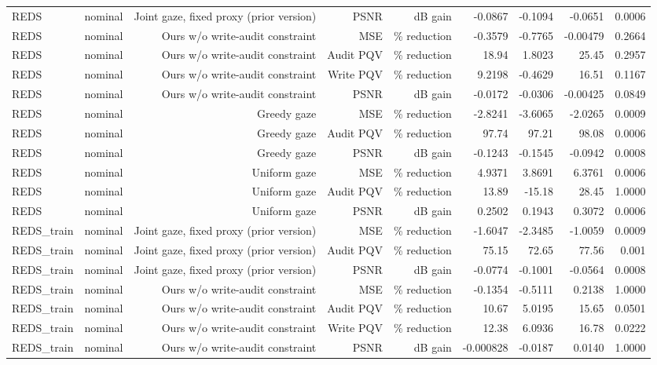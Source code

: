 \begin{table}[t]
\begin{tabular}{llrrrrrrr}
REDS & nominal & Joint gaze, fixed proxy (prior version) & PSNR & dB gain & -0.0867 & -0.1094 & -0.0651 & 0.0006 \\
REDS & nominal & Ours w/o write-audit constraint & MSE & \% reduction & -0.3579 & -0.7765 & -0.00479 & 0.2664 \\
REDS & nominal & Ours w/o write-audit constraint & Audit PQV & \% reduction & 18.94 & 1.8023 & 25.45 & 0.2957 \\
REDS & nominal & Ours w/o write-audit constraint & Write PQV & \% reduction & 9.2198 & -0.4629 & 16.51 & 0.1167 \\
REDS & nominal & Ours w/o write-audit constraint & PSNR & dB gain & -0.0172 & -0.0306 & -0.00425 & 0.0849 \\
REDS & nominal & Greedy gaze & MSE & \% reduction & -2.8241 & -3.6065 & -2.0265 & 0.0009 \\
REDS & nominal & Greedy gaze & Audit PQV & \% reduction & 97.74 & 97.21 & 98.08 & 0.0006 \\
REDS & nominal & Greedy gaze & PSNR & dB gain & -0.1243 & -0.1545 & -0.0942 & 0.0008 \\
REDS & nominal & Uniform gaze & MSE & \% reduction & 4.9371 & 3.8691 & 6.3761 & 0.0006 \\
REDS & nominal & Uniform gaze & Audit PQV & \% reduction & 13.89 & -15.18 & 28.45 & 1.0000 \\
REDS & nominal & Uniform gaze & PSNR & dB gain & 0.2502 & 0.1943 & 0.3072 & 0.0006 \\
REDS\_train & nominal & Joint gaze, fixed proxy (prior version) & MSE & \% reduction & -1.6047 & -2.3485 & -1.0059 & 0.0009 \\
REDS\_train & nominal & Joint gaze, fixed proxy (prior version) & Audit PQV & \% reduction & 75.15 & 72.65 & 77.56 & 0.001 \\
REDS\_train & nominal & Joint gaze, fixed proxy (prior version) & PSNR & dB gain & -0.0774 & -0.1001 & -0.0564 & 0.0008 \\
REDS\_train & nominal & Ours w/o write-audit constraint & MSE & \% reduction & -0.1354 & -0.5111 & 0.2138 & 1.0000 \\
REDS\_train & nominal & Ours w/o write-audit constraint & Audit PQV & \% reduction & 10.67 & 5.0195 & 15.65 & 0.0501 \\
REDS\_train & nominal & Ours w/o write-audit constraint & Write PQV & \% reduction & 12.38 & 6.0936 & 16.78 & 0.0222 \\
REDS\_train & nominal & Ours w/o write-audit constraint & PSNR & dB gain & -0.000828 & -0.0187 & 0.0140 & 1.0000 \\

\end{tabular}
\end{table}
